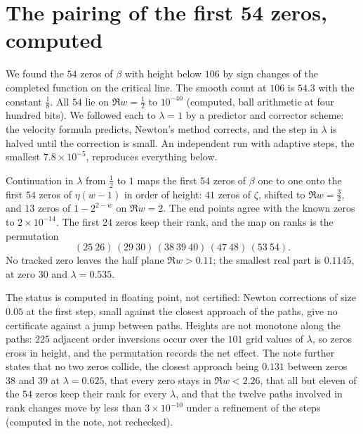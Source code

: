 \section{The pairing of the first 54 zeros, computed}\label{ml:sec:pairing}
We found the $54$ zeros of $\beta$ with height below $106$ by sign changes of the completed function on the critical line. The smooth count at $106$ is $54.3$ with the constant $\frac18$. All $54$ lie on $\Re w=\frac12$ to $10^{-40}$ (computed, ball arithmetic at four hundred bits). We followed each to $\lambda=1$ by a predictor and corrector scheme: the velocity formula predicts, Newton's method corrects, and the step in $\lambda$ is halved until the correction is small. An independent run with adaptive steps, the smallest $7.8\times10^{-5}$, reproduces everything below.
\begin{proposition}\label{ml:prop:pair}
Continuation in $\lambda$ from $\frac12$ to $1$ maps the first $54$ zeros of $\beta$ one to one onto the first $54$ zeros of $\eta(w-1)$ in order of height: $41$ zeros of $\zeta$, shifted to $\Re w=\frac32$, and $13$ zeros of $1-2^{2-w}$ on $\Re w=2$. The end points agree with the known zeros to $2\times10^{-14}$. The first $24$ zeros keep their rank, and the map on ranks is the permutation
\[(25\ 26)\,(29\ 30)\,(38\ 39\ 40)\,(47\ 48)\,(53\ 54).\]
No tracked zero leaves the half plane $\Re w>0.11$; the smallest real part is $0.1145$, at zero $30$ and $\lambda=0.535$.
\end{proposition}
The status is computed in floating point, not certified: Newton corrections of size $0.05$ at the first step, small against the closest approach of the paths, give no certificate against a jump between paths. Heights are not monotone along the paths: $225$ adjacent order inversions occur over the $101$ grid values of $\lambda$, so zeros cross in height, and the permutation records the net effect. The note further states that no two zeros collide, the closest approach being $0.131$ between zeros $38$ and $39$ at $\lambda=0.625$, that every zero stays in $\Re w<2.26$, that all but eleven of the $54$ zeros keep their rank for every $\lambda$, and that the twelve paths involved in rank changes move by less than $3\times10^{-10}$ under a refinement of the steps (computed in the note, not rechecked).%

